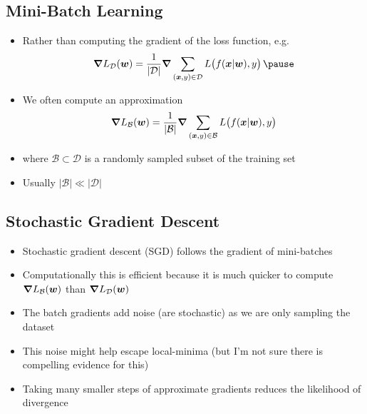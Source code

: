 
\begin{slide}
\section{Mini-Batch Learning}

\begin{PauseHighLight}
  \begin{itemize}
  \item Rather than computing the gradient of the loss function, e.g.
    \begin{align*}
      \grad L_{\mathcal{D}}(\bm{w}) = \frac{1}{|\mathcal{D}|}\grad \sum_{(\bm{x},y)\in\mathcal{D}}
      L\!\left( \strut f(\bm{x}|\bm{w}), y \right)\pause
    \end{align*}
  \item We often compute an approximation
    \begin{align*}
      \bm{\nabla} L_{\mathcal{B}}(\bm{w})
      = \frac{1}{|\mathcal{B}|}\bm{\nabla} \sum_{(\bm{x},y)\in\mathcal{B}}
      L\!\left( \strut f(\bm{x}|\bm{w}), y \right)
    \end{align*}
  \item where $\mathcal{B}\subset\mathcal{D}$ is a randomly sampled
    subset of the training set\pause
  \item Usually $|\mathcal{B}| \ll |\mathcal{D}|$\pause
  \end{itemize}
\end{PauseHighLight}

\end{slide}


\begin{slide}
  \section{Stochastic Gradient Descent}

\begin{PauseHighLight}
  \begin{itemize}
  \item Stochastic gradient descent (SGD) follows the gradient of
    mini-batches\pause
  \item Computationally this is efficient because it is much quicker to
    compute $\bm{\nabla} L_{\mathcal{B}}(\bm{w})$ than $\bm{\nabla}
    L_{\mathcal{D}}(\bm{w})$\pause
  \item The batch gradients add noise (are stochastic) as we are only
    sampling the dataset\pause
  \item This noise might help escape local-minima\pause{} (but I'm not sure
    there is compelling evidence for this)\pauseb
  \item Taking many smaller steps of approximate gradients reduces the
    likelihood of divergence\pause
  \end{itemize}
\end{PauseHighLight}


\end{slide}

